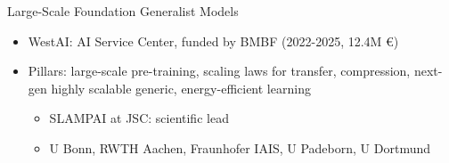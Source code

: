 \begin{frame}{Large-Scale Foundation Generalist Models}
\protect\hypertarget{large-scale-foundation-generalist-models-2}{}
\begin{itemize}
\tightlist
\item
  WestAI: AI Service Center, funded by BMBF (2022-2025, 12.4M €)
\item
  Pillars: large-scale pre-training, scaling laws for transfer,
  compression, next-gen highly scalable generic, energy-efficient
  learning

  \begin{itemize}
  \tightlist
  \item
    SLAMPAI at JSC: scientific lead
  \item
    U Bonn, RWTH Aachen, Fraunhofer IAIS, U Padeborn, U Dortmund
  \end{itemize}
\end{itemize}

\end{frame}

